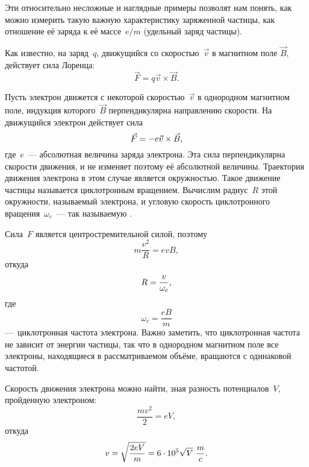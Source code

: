 Эти относительно несложные и наглядные примеры позволят нам понять, как можно
измерить такую важную характеристику
заряженной частицы, как отношение её заряда к её массе~$e/m$ (удельный заряд
частицы).


Как известно, на заряд~$q$, движущийся со скоростью~$\vec{v}$ в магнитном поле
$\vec{B}$, действует сила Лоренца:
\begin{equation*}
	\vec{F}=q{\vec{v}}\times{\vec{B}}.
\end{equation*}

Пусть электрон движется с некоторой скоростью~$\vec{v}$ в однородном магнитном
поле, индукция которого~$\vec{B}$
перпендикулярна направлению скорости. На движущийся электрон действует сила
\begin{equation}
	\eqmark{3.1}
	\vec{F}=-e{\vec{v}}\times{\vec{B}},
\end{equation}
где~$e$~--- абсолютная величина заряда электрона. Эта сила перпендикулярна
скорости движения, и не изменяет поэтому её абсолютной величины. Траектория
движения электрона в этом случае является окружностью. Такое движение частицы
называется циклотронным вращением. Вычислим радиус~$R$ этой окружности,
называемый  электрона, и угловую скорость
циклотронного вращения~$\omega_c$~--- так называемую .

Сила~$F$ является центростремительной силой, поэтому
\begin{equation*}
	m\frac{v^2}{R}=evB,
\end{equation*}
откуда
\begin{equation}
	\eqmark{3.2}
	R =\frac{v}{\omega_c},
\end{equation}
где
\begin{equation*}
	\omega_c=\frac{eB}{m}
\end{equation*}
---~циклотронная частота электрона. Важно заметить, что циклотронная частота не
зависит от энергии частицы, так что в однородном магнитном поле все электроны,
находящиеся в рассматриваемом объёме, вращаются с одинаковой частотой.

Скорость движения электрона можно найти, зная разность потенциалов~$V$,
пройденную электроном:
\begin{equation*}
	\frac{mv^2}{2}=eV,
\end{equation*}
откуда
\begin{equation}
	\eqmark{3.3}
	v=\sqrt{\frac{2eV}{m}} = 6\cdot10^5\sqrt{V}~\frac{m}{c}.
\end{equation}

